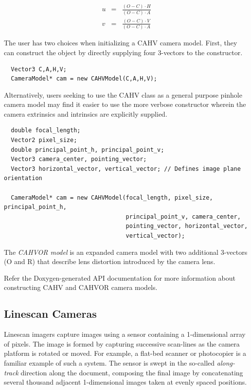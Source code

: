 \begin{eqnarray}
u & = & \frac{(O-C) \cdot H}{(O-C) \cdot A}\\
v & = & \frac{(O-C) \cdot V}{(O-C) \cdot A}
\end{eqnarray}

The user has two choices when initializing a CAHV camera model.
First, they can construct the object by directly supplying four
3-vectors to the constructor.

\begin{verbatim}
  Vector3 C,A,H,V;
  CameraModel* cam = new CAHVModel(C,A,H,V);
\end{verbatim}

Alternatively, users seeking to use the CAHV class as a general purpose pinhole
camera model may find it easier to use the more verbose constructor
wherein the camera extrinsics and intrinsics are explicitly supplied.

\begin{verbatim}
  double focal_length;
  Vector2 pixel_size;
  double principal_point_h, principal_point_v;
  Vector3 camera_center, pointing_vector;
  Vector3 horizontal_vector, vertical_vector; // Defines image plane orientation

  CameraModel* cam = new CAHVModel(focal_length, pixel_size, principal_point_h, 
                                   principal_point_v, camera_center, 
                                   pointing_vector, horizontal_vector,
                                   vertical_vector);  
\end{verbatim}


The {\em CAHVOR model} is an expanded camera model with two additional
3-vectors (O and R) that describe lens distortion introduced by the
camera lens.

Refer the Doxygen-generated API documentation for more information
about constructing CAHV and CAHVOR camera models.

\subsection{Linescan Cameras}

Linescan imagers capture images using a sensor containing a
1-dimensional array of pixels.  The image is formed by capturing
successive scan-lines as the camera platform is rotated or moved.  For
example, a flat-bed scanner or photocopier is a familiar example of
such a system.  The sensor is swept in the so-called {\em along-track}
direction along the document, composing the final image by
concatenating several thousand adjacent 1-dimensional images taken at
evenly spaced positions.


